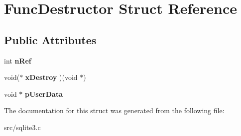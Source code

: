 \hypertarget{struct_func_destructor}{\section{Func\-Destructor Struct Reference}
\label{struct_func_destructor}
}
\subsection*{Public Attributes}
\begin{DoxyCompactItemize}
\item 
\hypertarget{struct_func_destructor_a8b1bf3af00c88400efc1dd74a4410463}{int {\bfseries n\-Ref}}\label{struct_func_destructor_a8b1bf3af00c88400efc1dd74a4410463}

\item 
\hypertarget{struct_func_destructor_a8d688d51ad881306c81b3f8d4795e076}{void($\ast$ {\bfseries x\-Destroy} )(void $\ast$)}\label{struct_func_destructor_a8d688d51ad881306c81b3f8d4795e076}

\item 
\hypertarget{struct_func_destructor_a181875609f0f8221985cd6cfd7ad8cd8}{void $\ast$ {\bfseries p\-User\-Data}}\label{struct_func_destructor_a181875609f0f8221985cd6cfd7ad8cd8}

\end{DoxyCompactItemize}


The documentation for this struct was generated from the following file\-:\begin{DoxyCompactItemize}
\item 
src/sqlite3.\-c\end{DoxyCompactItemize}
